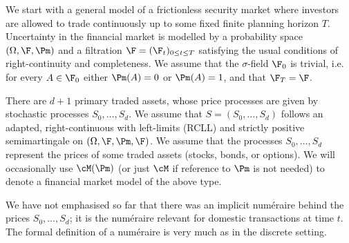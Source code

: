 We start with a general model of a frictionless security market where investors are allowed to trade continuously up to some fixed finite planning horizon \(T\). Uncertainty in the financial market is modelled by a probability space \((\Omega, \F, \Pm)\) and a filtration \(\F = (\F_t)_{0 \le t \le T}\) satisfying the usual conditions of right-continuity and completeness. We assume that the \(\sigma\)-field \(\F_0\) is trivial, i.e. for every \(A \in \F_0\) either \(\Pm(A) = 0\) or \(\Pm(A) = 1\), and that \(\F_T = \F\).

There are \(d+1\) primary traded assets, whose price processes are given by stochastic processes \(S_0, \dots, S_d\). We assume that \(S = (S_0, \dots, S_d)\) follows an adapted, right-continuous with left-limits (RCLL) and strictly positive semimartingale on \((\Omega, \F, \Pm, \F)\). We assume that the processes \(S_0, \dots, S_d\) represent the prices of some traded assets (stocks, bonds, or options). We will occasionally use \(\cM(\Pm)\) (or just \(\cM\) if reference to \(\Pm\) is not needed) to denote a financial market model of the above type.

We have not emphasised so far that there was an implicit num\'{e}raire behind the prices \(S_0, \dots, S_d\); it is the num\'{e}raire relevant for domestic transactions at time \(t\). The formal definition of a num\'{e}raire is very much as in the discrete setting.

